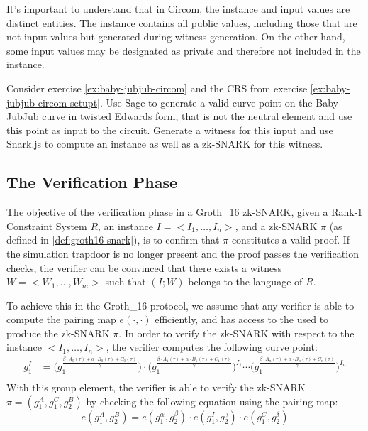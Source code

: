 \begin{example}
It's important to understand that in Circom, the instance and input values are distinct entities. The instance contains all public values, including those that are not input values but generated during witness generation. On the other hand, some input values may be designated as private and therefore not included in the instance. 
\end{example}

\begin{exercise} 
\label{ex:baby-jubjub-circom-prover}
Consider exercise \ref{ex:baby-jubjub-circom} and the CRS from exercise \ref{ex:baby-jubjub-circom-setupt}. Use Sage to generate a valid curve point on the Baby-JubJub curve in twisted Edwards form, that is not the neutral element and use this point as input to the circuit. Generate a witness for this input and use Snark.js to compute an instance as well as a zk-SNARK for this witness. 
\end{exercise}

\subsection{The Verification Phase}
\label{sec:groth16-verifier}
The objective of the verification phase in a Groth\_16 zk-SNARK, given a Rank-1 Constraint System $R$, an instance $I = <I_1, \ldots, I_n>$, and a zk-SNARK $\pi$ (as defined in \ref{def:groth16-snark}), is to confirm that $\pi$ constitutes a valid proof. If the simulation trapdoor is no longer present and the proof passes the verification checks, the verifier can be convinced that there exists a witness $W = <W_1, \ldots, W_m>$ such that $(I;W)$ belongs to the language of $R$. 

To achieve this in the Groth\_16 protocol, we assume that any verifier is able to compute the pairing map $e(\cdot,\cdot)$ efficiently, and has access to the  used to produce the zk-SNARK $\pi$. In order to verify the zk-SNARK with respect to the instance $<I_1,\ldots, I_n>$, the verifier computes the following curve point:
\begin{align*}
g_1^I & = \Big(g_1^{\frac{\beta\cdot A_{0}(\tau)+\alpha\cdot B_{0}(\tau)+C_{0}(\tau)}{\gamma}}\Big)\cdot \Big(g_1^{\frac{\beta\cdot A_{1}(\tau)+\alpha\cdot B_{1}(\tau)+C_{1}(\tau)}{\gamma}}\Big)^{I_1} \cdots \Big(g_1^{\frac{\beta\cdot A_{n}(\tau)+\alpha\cdot B_{n}(\tau)+C_{n}(\tau)}{\gamma}}\Big)^{I_n}\\
\end{align*}
With this group element, the verifier is able to verify the zk-SNARK $\pi=(g_1^A,g_1^C,g_2^B)$ by checking the following equation using the pairing map:
\begin{equation}
\label{def:groth16-verifier-equation}
e(g_1^A, g_2^B) = e(g_1^\alpha,g_2^\beta)\cdot e(g_1^I,g_2^\gamma)\cdot e(g_1^C,g_2^\delta)
\end{equation}

